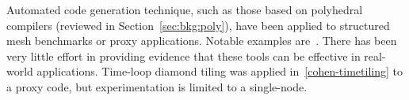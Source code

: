 Automated code generation technique, such as those based on polyhedral compilers (reviewed in Section~\ref{sec:bkg:poly}), have been applied to structured mesh benchmarks or proxy applications. Notable examples are~\cite{pluto,polly,loopy}. There has been very little effort in providing evidence that these tools can be effective in real-world applications. Time-loop diamond tiling was applied in~\ref{cohen-timetiling} to a proxy code, but experimentation is limited to a single-node.
%
%
%





